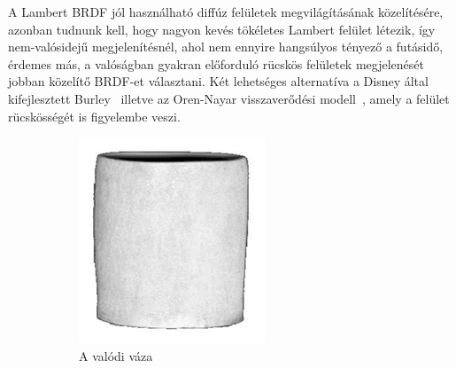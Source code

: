 A Lambert BRDF jól használható diffúz felületek megvilágításának közelítésére, azonban tudnunk kell, hogy nagyon kevés tökéletes Lambert felület létezik, így nem-valósidejű megjelenítésnél, ahol nem ennyire hangsúlyos tényező a futásidő, érdemes más, a valóságban gyakran előforduló rücskös felületek megjelenését jobban közelítő BRDF-et választani. Két lehetséges alternatíva a Disney által kifejlesztett Burley~\cite{burley2012physically} illetve az Oren-Nayar visszaverődési modell~\cite{oren1994generalization}, amely a felület rücskösségét is figyelembe veszi.

\begin{figure}[!ht]
    \centering
    \begin{subfigure}[b]{0.25\textwidth}
        \includegraphics[width=\textwidth]{images/vase_a.png}
        \caption{A valódi váza}
    \end{subfigure}
    \hfill
    \begin{subfigure}[b]{0.25\textwidth}

\end{subfigure}
\end{figure}
